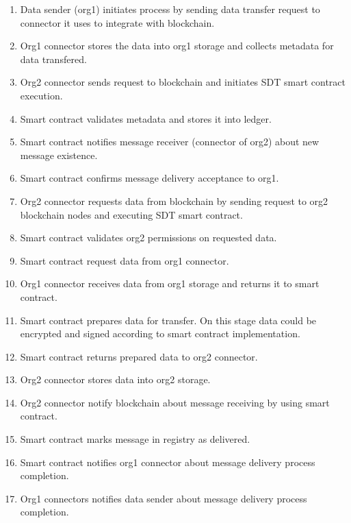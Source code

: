 \documentclass[10pt]{llncs}
\begin{document}
\begin{enumerate}
    \item Data sender (org1) initiates process by sending data transfer request to connector it uses to integrate with blockchain.
    \item Org1 connector stores the data into org1 storage and collects metadata for data transfered.
    \item Org2 connector sends request to blockchain and initiates SDT smart contract execution.
    \item Smart contract validates metadata and stores it into ledger.
    \item Smart contract notifies message receiver (connector of org2) about new message existence.
    \item Smart contract confirms message delivery acceptance to org1.
    \item Org2 connector requests data from blockchain by sending request to org2 blockchain nodes and executing SDT smart contract.
    \item Smart contract validates org2 permissions on requested data.
    \item Smart contract request data from org1 connector.
    \item Org1 connector receives data from org1 storage and returns it to smart contract.
    \item Smart contract prepares data for transfer.
    On this stage data could be encrypted and signed according to smart contract implementation.
    \item Smart contract returns prepared data to org2 connector.
    \item Org2 connector stores data into org2 storage.
    \item Org2 connector notify blockchain about message receiving by using smart contract.
    \item Smart contract marks message in registry as delivered.
    \item Smart contract notifies org1 connector about message delivery process completion.
    \item Org1 connectors notifies data sender about message delivery process completion. 
\end{enumerate}
\end{document}
